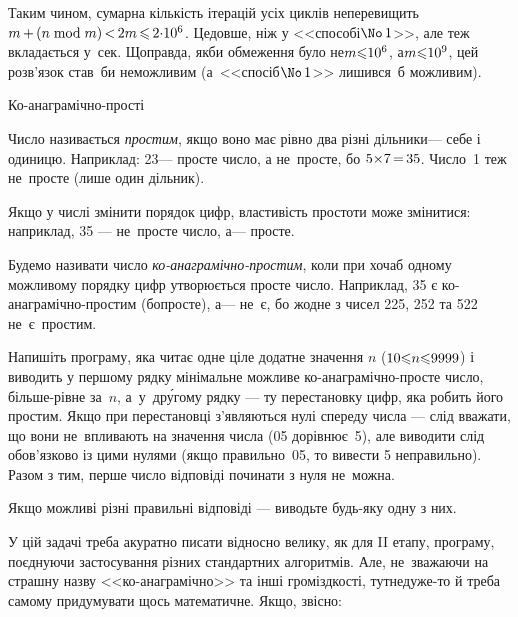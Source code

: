 \documentclass[14pt,a4paper]{extarticle}
\def\dib#1{\,#1\discretionary{}{\mbox{$#1$}}{}\,}
\begin{document}
Таким чином, сумарна кількість ітерацій усіх циклів не\nolinebreak[3] перевищить $m\dib{{+}}(n\bmod m)\dib{{<}}2m\dib{{\<}}{2{\cdot}10^6}$. Це\nolinebreak[3] довше, ніж у <<способі\nolinebreak[3] $\No\,1$>>, але теж вкладається у~сек. Щоправда, якби обмеження було не\nolinebreak[3] ${m{\leqslant}10^6}$, а\nolinebreak[2] ${m{\leqslant}10^9}$, цей розв'язок став~би неможливим (а~<<спосіб\nolinebreak[3] $\No\,1$>> лишився~б можливим).



\begin{problemAllDefault}{Ко-анаграмічно-прості}

Число називається \emph{простим}, якщо воно має рівно два різні дільники\nolinebreak[3] --- себе і одиницю. Наприклад: 23\nolinebreak[3] --- просте число, а не~просте, бо $5{\*}7\dib{{=}}35$. Число~1 теж не~просте (лише один дільник).

Якщо у числі змінити порядок цифр, властивість простоти може змінитися: наприклад, 35 --- не~просте число, а\nolinebreak[3] --- просте.

Будемо називати число \emph{ко-анаграмічно-простим}, коли при хоча\nolinebreak[3] б одному можливому порядку цифр утворюється просте число. Наприклад, 35 є ко-анаграмічно-простим (бо\nolinebreak[3] просте), а\nolinebreak[3] --- не~є, бо жодне з чисел 225, 252 та 522 не~є~простим.

Напишіть програму, яка читає одне ціле додатне значення $n$ ($10{\leqslant}n{\leqslant}9999$) і виводить у першому рядку мінімальне можливе ко-анаграмічно-просте число, більше-рівне за~$n$, а~у~др\'{у}гому рядку --- ту перестановку цифр, яка робить його простим. Якщо при перестановці з’являються нулі спереду числа --- слід вважати, що вони не~впливають на значення числа (05 дорівнює~5), але виводити слід обов’язково із цими нулями (якщо правильно~05, то вивести 5 неправильно). Разом з тим, перше число відповіді починати з нуля не~можна.

Якщо можливі різні правильні відповіді --- виводьте будь-яку одну з них.

\Examples
\begin{exampleSimple}{4em}{4em}%
%
%
%
\end{exampleSimple}

\end{problemAllDefault}
	

\Tutorial	У цій задачі треба акуратно писати відносно велику, як для II етапу, програму, поєднуючи застосування різних стандартних алгоритмів. Але, не~зважаючи на страшну назву <<ко-ана\-гра\-мічно>> та інші громіздкості, тут\nolinebreak[2] не\nolinebreak[3] дуже-то й треба самому придумувати щось математичне. Якщо, звісно:
\end{document}
